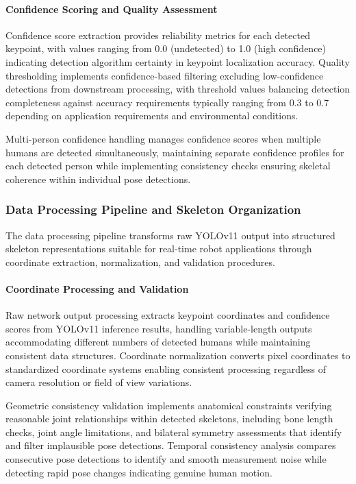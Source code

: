 \paragraph{Confidence Scoring and Quality Assessment}

Confidence score extraction provides reliability metrics for each detected keypoint, with values ranging from 0.0 (undetected) to 1.0 (high confidence) indicating detection algorithm certainty in keypoint localization accuracy. Quality thresholding implements confidence-based filtering excluding low-confidence detections from downstream processing, with threshold values balancing detection completeness against accuracy requirements typically ranging from 0.3 to 0.7 depending on application requirements and environmental conditions.

Multi-person confidence handling manages confidence scores when multiple humans are detected simultaneously, maintaining separate confidence profiles for each detected person while implementing consistency checks ensuring skeletal coherence within individual pose detections.

\subsubsection{Data Processing Pipeline and Skeleton Organization}

The data processing pipeline transforms raw YOLOv11 output into structured skeleton representations suitable for real-time robot applications through coordinate extraction, normalization, and validation procedures.

\paragraph{Coordinate Processing and Validation}

Raw network output processing extracts keypoint coordinates and confidence scores from YOLOv11 inference results, handling variable-length outputs accommodating different numbers of detected humans while maintaining consistent data structures. Coordinate normalization converts pixel coordinates to standardized coordinate systems enabling consistent processing regardless of camera resolution or field of view variations.

Geometric consistency validation implements anatomical constraints verifying reasonable joint relationships within detected skeletons, including bone length checks, joint angle limitations, and bilateral symmetry assessments that identify and filter implausible pose detections. Temporal consistency analysis compares consecutive pose detections to identify and smooth measurement noise while detecting rapid pose changes indicating genuine human motion.

